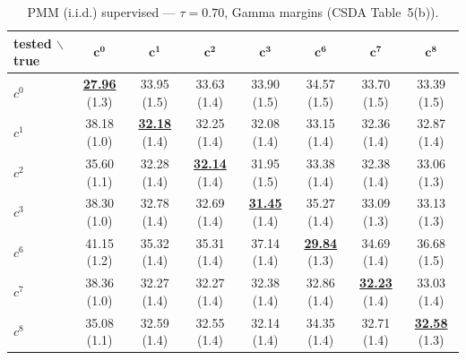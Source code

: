 \begin{table}[htbp]
  \centering
  \small
  \setlength{\tabcolsep}{4pt}
  \caption{PMM (i.i.d.) supervised — $\tau = 0.70$, Gamma margins (CSDA Table~5(b)).}
  \label{tab:exp2-high_tau_gamma}
  \begin{tabular}{lccccccc}
    \toprule
    tested $\backslash$ true & $\mathbf{c^{0}}$ & $\mathbf{c^{1}}$ & $\mathbf{c^{2}}$ & $\mathbf{c^{3}}$ & $\mathbf{c^{6}}$ & $\mathbf{c^{7}}$ & $\mathbf{c^{8}}$ \\
    \midrule
    $c^{0}$ & \textbf{\underline{27.96}} (1.3) & 33.95 (1.5) & 33.63 (1.4) & 33.90 (1.5) & 34.57 (1.5) & 33.70 (1.5) & 33.39 (1.5) \\
    $c^{1}$ & 38.18 (1.0) & \textbf{\underline{32.18}} (1.4) & 32.25 (1.4) & 32.08 (1.4) & 33.15 (1.4) & 32.36 (1.4) & 32.87 (1.4) \\
    $c^{2}$ & 35.60 (1.1) & 32.28 (1.4) & \textbf{\underline{32.14}} (1.4) & 31.95 (1.5) & 33.38 (1.4) & 32.38 (1.4) & 33.06 (1.3) \\
    $c^{3}$ & 38.30 (1.0) & 32.78 (1.4) & 32.69 (1.4) & \textbf{\underline{31.45}} (1.4) & 35.27 (1.4) & 33.09 (1.3) & 33.13 (1.3) \\
    $c^{6}$ & 41.15 (1.2) & 35.32 (1.4) & 35.31 (1.4) & 37.14 (1.4) & \textbf{\underline{29.84}} (1.3) & 34.69 (1.4) & 36.68 (1.5) \\
    $c^{7}$ & 38.36 (1.0) & 32.27 (1.4) & 32.27 (1.4) & 32.38 (1.4) & 32.86 (1.4) & \textbf{\underline{32.23}} (1.4) & 33.03 (1.4) \\
    $c^{8}$ & 35.08 (1.1) & 32.59 (1.4) & 32.55 (1.4) & 32.14 (1.4) & 34.35 (1.4) & 32.71 (1.4) & \textbf{\underline{32.58}} (1.3) \\
    \bottomrule
  \end{tabular}
\end{table}
